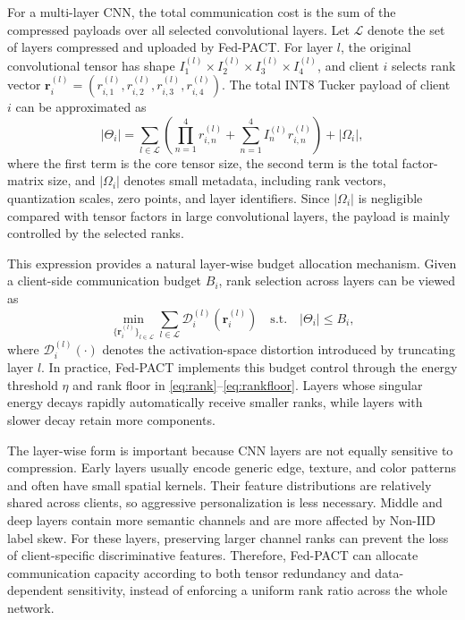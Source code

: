 \documentclass[conference]{IEEEtran}
\begin{document}
For a multi-layer CNN, the total communication cost is the sum of the compressed payloads over all selected convolutional layers. Let $\mathcal{L}$ denote the set of layers compressed and uploaded by Fed-PACT. For layer $l$, the original convolutional tensor has shape
$I_1^{(l)}\times I_2^{(l)}\times I_3^{(l)}\times I_4^{(l)}$, and client $i$ selects rank vector
$\mathbf{r}_i^{(l)}=(r_{i,1}^{(l)},r_{i,2}^{(l)},r_{i,3}^{(l)},r_{i,4}^{(l)})$.
The total INT8 Tucker payload of client $i$ can be approximated as
\begin{equation}
    |\Theta_i|=\sum_{l\in \mathcal{L}}
    \left(
    \prod_{n=1}^{4} r_{i,n}^{(l)}+\sum_{n=1}^{4} I_{n}^{(l)} r_{i,n}^{(l)}
    \right)+|\Omega_i|,
    \label{eq:multilayer_payload}
\end{equation}
where the first term is the core tensor size, the second term is the total factor-matrix size, and $|\Omega_i|$ denotes small metadata, including rank vectors, quantization scales, zero points, and layer identifiers. Since $|\Omega_i|$ is negligible compared with tensor factors in large convolutional layers, the payload is mainly controlled by the selected ranks.

This expression provides a natural layer-wise budget allocation mechanism. Given a client-side communication budget $B_i$, rank selection across layers can be viewed as
\begin{equation}
    \min_{\{\mathbf{r}_i^{(l)}\}_{l\in\mathcal{L}}}
    \sum_{l\in\mathcal{L}}
    \mathcal{D}_i^{(l)}(\mathbf{r}_i^{(l)})
    \quad\text{s.t.}\quad
    |\Theta_i|\leq B_i,
    \label{eq:layer_budget}
\end{equation}
where $\mathcal{D}_i^{(l)}(\cdot)$ denotes the activation-space distortion introduced by truncating layer $l$. In practice, Fed-PACT implements this budget control through the energy threshold $\eta$ and rank floor in \eqref{eq:rank}--\eqref{eq:rankfloor}. Layers whose singular energy decays rapidly automatically receive smaller ranks, while layers with slower decay retain more components.

The layer-wise form is important because CNN layers are not equally sensitive to compression. Early layers usually encode generic edge, texture, and color patterns and often have small spatial kernels. Their feature distributions are relatively shared across clients, so aggressive personalization is less necessary. Middle and deep layers contain more semantic channels and are more affected by Non-IID label skew. For these layers, preserving larger channel ranks can prevent the loss of client-specific discriminative features. Therefore, Fed-PACT can allocate communication capacity according to both tensor redundancy and data-dependent sensitivity, instead of enforcing a uniform rank ratio across the whole network.
\end{document}
